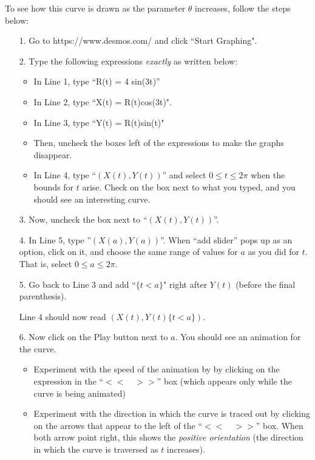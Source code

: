 \documentclass{ximera}
\begin{document}
\begin{exercise}
\begin{exercise}
To see how this curve is drawn as the parameter $\theta$ increases, follow the steps below:

\begin{itemize}
\item[1.] Go to https://www.desmos.com/ and click ``Start Graphing".
\item[2.] Type the following expressions \emph{exactly} as written below:
\begin{itemize}
\item In Line 1, type ``R(t) = 4 sin(3t)''
\item In Line 2, type ``X(t) = R(t)cos(3t)".  
\item In Line 3, type ``Y(t) = R(t)sin(t)"
\item Then, uncheck the boxes left of the expressions to make the graphs disappear.
\item In Line 4, type ``$(X(t),Y(t))$'' and select $0\leq t \leq2\pi$ when the bounds for $t$ arise.  Check on the box next to what you typed, and you should see an interesting curve.
\end{itemize}
\item[3.] Now, uncheck the box next to ``$(X(t),Y(t))$''.
\item[4.] In Line 5, type ''$(X(a),Y(a))$''.  When ``add slider'' pops up as an option, click on it, and choose the same range of values for $a$ as you did for $t$.  That is, select $0 \leq a \leq 2\pi$.
\item[5.] Go back to Line 3 and add ``$\{t<a\}$" right after $Y(t)$ (before the final parenthesis).  

Line 4 should now read $(X(t),Y(t)\{t<a\} )$.

\item[6.] Now click on the Play button next to $a$.  You should see an animation for the curve.  
\begin{itemize}
\item Experiment with the speed of the animation by by clicking on the expression in the ``$<< \quad >>$'' box (which appears only while the curve is being animated)
\item Experiment with the direction in which the curve is traced out by clicking on the arrows that appear to the left of the ``$<< \quad >>$'' box.  When both arrow point right, this shows the \emph{positive orientation} (the direction in which the curve is traversed as $t$ increases).
\end{itemize}
\end{itemize}


\end{exercise}
\end{exercise}
\end{document}
